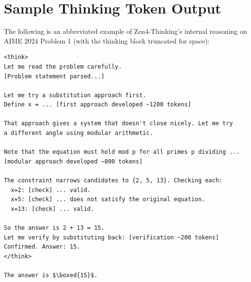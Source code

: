 \documentclass[11pt,a4paper]{article}
\begin{document}
\section{Sample Thinking Token Output}

The following is an abbreviated example of Zen4-Thinking's internal reasoning on AIME 2024
Problem 1 (with the thinking block truncated for space):

\begin{lstlisting}[caption=Abbreviated Thinking Block Example (AIME 2024 P1)]
<think>
Let me read the problem carefully.
[Problem statement parsed...]

Let me try a substitution approach first.
Define x = ... [first approach developed ~1200 tokens]

That approach gives a system that doesn't close nicely. Let me try
a different angle using modular arithmetic.

Note that the equation must hold mod p for all primes p dividing ...
[modular approach developed ~800 tokens]

The constraint narrows candidates to {2, 5, 13}. Checking each:
  x=2: [check] ... valid.
  x=5: [check] ... does not satisfy the original equation.
  x=13: [check] ... valid.

So the answer is 2 + 13 = 15.
Let me verify by substituting back: [verification ~200 tokens]
Confirmed. Answer: 15.
</think>

The answer is $\boxed{15}$.
\end{lstlisting}
\end{document}
